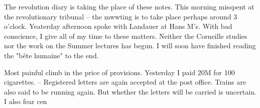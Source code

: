 
The revolution diary is taking the place of these notes. This morning misspent at the revolutionary tribunal -- the mwwting is to take place perhaps around 3 o'clock. Yeaterday afternoon spoke with Landauer at Hans M's. With bad conscience, I give all of my time to these matters. Neither the Corneille studies nor the work on the Summer lectures has begun. I will soon have finished reading the "bête humaine" to the end.

Most painful climb in the price of provisions. Yesterday I paid 20M for 100 cigarettes. -- Registered letters are again accepted at the post office. Trains are also said to be running again. But whether the letters will be carried is uncertain. I also fear cen

